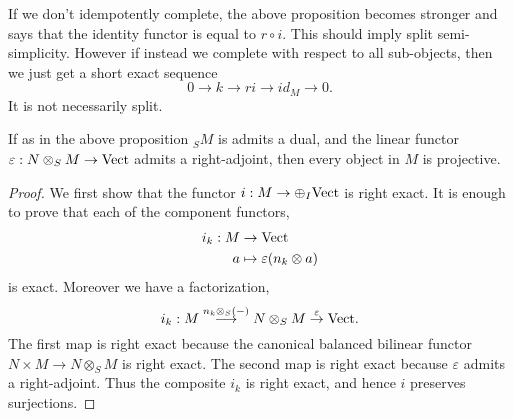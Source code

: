\documentclass{amsart}
\begin{document}
{\color{CSPcolor} If we don't idempotently complete, the above proposition becomes stronger and says that the identity functor is equal to $r \circ i$. This should imply split semi-simplicity. However if instead we complete with respect to all sub-objects, then we just get a short exact sequence
\begin{equation*}
	0 \to k \to ri \to id_M \to 0.
\end{equation*}
It is not necessarily split. 
 }

\begin{corollary}
	If as in the above proposition ${}_S M$ is admits a dual, and the linear functor $\varepsilon:N \otimes_S M \to \mathrm{Vect} $ admits a right-adjoint, then every object in $M$ is projective.
\end{corollary}

\begin{proof}
We first show that the functor $i: M \to \oplus_I \mathrm{Vect}$ is right exact. It is enough to prove that each of the component functors, 
\begin{align*}
	i_k:  M & \to \mathrm{Vect} \\
		a & \mapsto \varepsilon(n_k \otimes a)
\end{align*}
 is exact. Moreover we have a factorization,
\begin{equation*}
	i_k : M \stackrel{ n_k \otimes_S (-) }{\longrightarrow} N \otimes_S M \stackrel{\varepsilon}{\to} \mathrm{Vect}.
\end{equation*}	
The first map is right exact because the canonical balanced bilinear functor $N \times M \to  N \otimes_S M$ is right exact. The second map is right exact because $\varepsilon$ admits a right-adjoint. Thus the composite $i_k$ is right exact, and hence $i$ preserves surjections. 
	

\end{proof}
\end{document}
